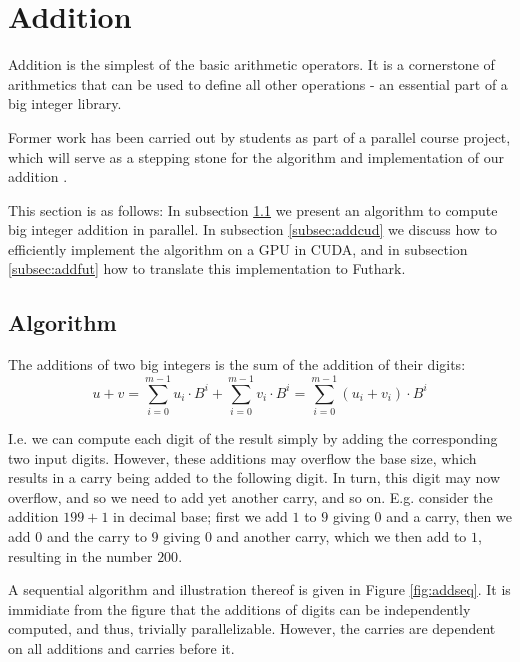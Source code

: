 \section{Addition}
\label{sec:add}

Addition is the simplest of the basic arithmetic operators. It is a cornerstone
of arithmetics that can be used to define all other operations - an essential
part of a big integer library.

Former work has been carried out by students as part of a parallel course
project, which will serve as a stepping stone for the algorithm and
implementation of our addition \cite{DPPproject}.

This section is as follows: In subsection \ref{subsec:addalg} we present an
algorithm to compute big integer addition in parallel. In subsection
\ref{subsec:addcud} we discuss how to efficiently implement the algorithm on a
GPU in CUDA, and in subsection \ref{subsec:addfut} how to translate this
implementation to Futhark.

\subsection{Algorithm}
\label{subsec:addalg}

The additions of two big integers is the sum of the addition of their digits:
\begin{equation}
  \label{eq:add}
  u + v = \sum_{i=0}^{m-1}u_i\cdot B^{i} + \sum_{i=0}^{m-1}v_i\cdot B^{i} = \sum_{i=0}^{m-1}(u_i+v_i)\cdot B^{i}
\end{equation}

I.e. we can compute each digit of the result simply by adding the corresponding
two input digits. However, these additions may overflow the base size, which
results in a carry being added to the following digit. In turn, this digit may
now overflow, and so we need to add yet another carry, and so on. E.g. consider
the addition $199 + 1$ in decimal base; first we add $1$ to $9$ giving $0$ and a
carry, then we add $0$ and the carry to $9$ giving $0$ and another carry, which
we then add to $1$, resulting in the number $200$.

A sequential algorithm and illustration thereof is given in Figure
\ref{fig:addseq}. It is immidiate from the figure that the additions of digits
can be independently computed, and thus, trivially parallelizable. However, the
carries are dependent on all additions and carries before it.

